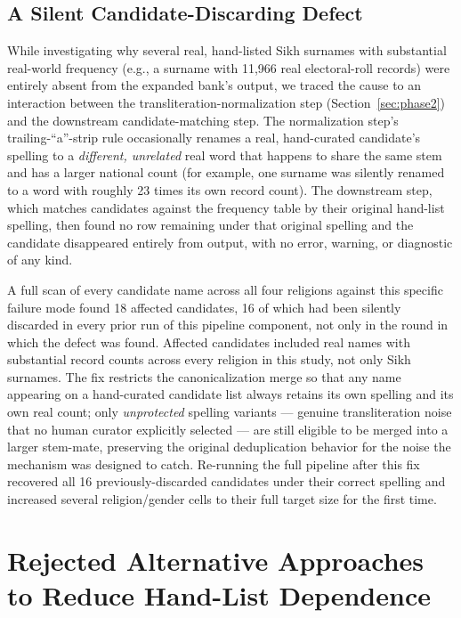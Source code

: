 \documentclass[11pt]{article}
\begin{document}
\subsection{A Silent Candidate-Discarding Defect}
\label{sec:bug}

While investigating why several real, hand-listed Sikh surnames with substantial real-world frequency (e.g., a surname with 11,966 real electoral-roll records) were entirely absent from the expanded bank's output, we traced the cause to an interaction between the transliteration-normalization step (Section~\ref{sec:phase2}) and the downstream candidate-matching step. The normalization step's trailing-``a''-strip rule occasionally renames a real, hand-curated candidate's spelling to a \emph{different, unrelated} real word that happens to share the same stem and has a larger national count (for example, one surname was silently renamed to a word with roughly 23 times its own record count). The downstream step, which matches candidates against the frequency table by their original hand-list spelling, then found no row remaining under that original spelling and the candidate disappeared entirely from output, with no error, warning, or diagnostic of any kind.

A full scan of every candidate name across all four religions against this specific failure mode found 18 affected candidates, 16 of which had been silently discarded in every prior run of this pipeline component, not only in the round in which the defect was found. Affected candidates included real names with substantial record counts across every religion in this study, not only Sikh surnames. The fix restricts the canonicalization merge so that any name appearing on a hand-curated candidate list always retains its own spelling and its own real count; only \emph{unprotected} spelling variants --- genuine transliteration noise that no human curator explicitly selected --- are still eligible to be merged into a larger stem-mate, preserving the original deduplication behavior for the noise the mechanism was designed to catch. Re-running the full pipeline after this fix recovered all 16 previously-discarded candidates under their correct spelling and increased several religion/gender cells to their full target size for the first time.

\section{Rejected Alternative Approaches to Reduce Hand-List Dependence}
\label{sec:rejected}
\end{document}

